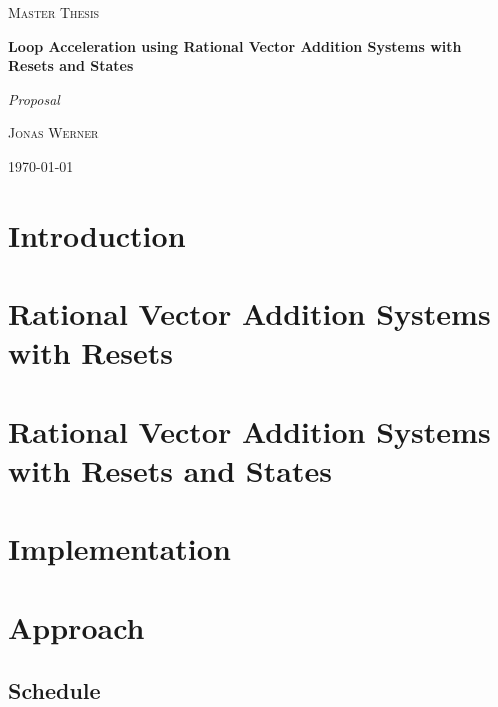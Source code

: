 \documentclass{article}
\begin{document}
\newcommand{\HorizontalLine}{\rule{\linewidth}{0.3mm}}

\begin{center}
	{\scshape\Large Master Thesis \par}
	\vspace{1.5cm}
	{\huge\bfseries Loop Acceleration using Rational Vector Addition Systems with Resets and States \par}
    {\huge \slshape Proposal \par}
	\vspace{1cm}
	{\large \scshape Jonas Werner\par}
	\vspace{0.5cm}
	{\today \vspace{2cm}}
\end{center}

\vspace*{2cm}

\section{Introduction}




\section{Rational Vector Addition Systems with Resets}





\section{Rational Vector Addition Systems with Resets and States}


\section{Implementation}
\begin{minipage}{0.8\textwidth}

\end{minipage}

\begin{minipage}{0.8\textwidth}

\end{minipage}

\begin{minipage}{0.8\textwidth}

\end{minipage}
\section{Approach}

\begin{landscape}
\section{Schedule}


\end{landscape}



\pagebreak
{}


\end{document}
